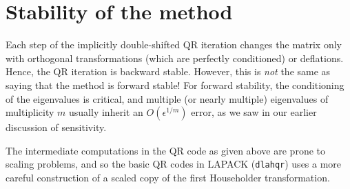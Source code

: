 \section{Stability of the method}

Each step of the implicitly double-shifted QR iteration changes the
matrix only with orthogonal transformations (which are perfectly conditioned)
or deflations.  Hence, the QR iteration is backward stable.  However,
this is {\em not} the same as saying that the method is forward stable!
For forward stability, the conditioning of the eigenvalues is critical,
and multiple (or nearly multiple) eigenvalues of multiplicity $m$
usually inherit an $O(\epsilon^{1/m})$ error, as we saw in our earlier
discussion of sensitivity.

The intermediate computations in the QR code as given above are prone to
scaling problems, and so the basic QR codes in LAPACK ({\tt dlahqr})
uses a more careful construction of a scaled copy of the first Householder
transformation.
